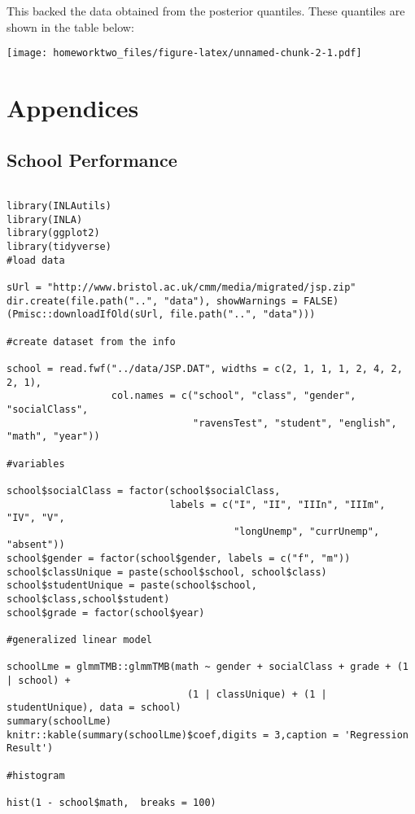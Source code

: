 \documentclass[
  12pt,
]{article}
\begin{document}
This backed the data obtained from the posterior quantiles. These
quantiles are shown in the table below:

\texttt{[image: homeworktwo\_files/figure-latex/unnamed-chunk-2-1.pdf]}

\hypertarget{appendices}{%
\section{Appendices}\label{appendices}}

\hypertarget{school-performance}{%
\subsection{School Performance}\label{school-performance}}

\begin{verbatim}

library(INLAutils)
library(INLA)
library(ggplot2)
library(tidyverse)
#load data

sUrl = "http://www.bristol.ac.uk/cmm/media/migrated/jsp.zip" 
dir.create(file.path("..", "data"), showWarnings = FALSE) 
(Pmisc::downloadIfOld(sUrl, file.path("..", "data")))

#create dataset from the info

school = read.fwf("../data/JSP.DAT", widths = c(2, 1, 1, 1, 2, 4, 2, 2, 1), 
                  col.names = c("school", "class", "gender", "socialClass", 
                                "ravensTest", "student", "english", "math", "year"))

#variables

school$socialClass = factor(school$socialClass, 
                            labels = c("I", "II", "IIIn", "IIIm", "IV", "V", 
                                       "longUnemp", "currUnemp", "absent"))
school$gender = factor(school$gender, labels = c("f", "m"))
school$classUnique = paste(school$school, school$class) 
school$studentUnique = paste(school$school, school$class,school$student)
school$grade = factor(school$year)

#generalized linear model

schoolLme = glmmTMB::glmmTMB(math ~ gender + socialClass + grade + (1 | school) + 
                               (1 | classUnique) + (1 | studentUnique), data = school)
summary(schoolLme)
knitr::kable(summary(schoolLme)$coef,digits = 3,caption = 'Regression Result')

#histogram

hist(1 - school$math,  breaks = 100)


\end{verbatim}
\end{document}
